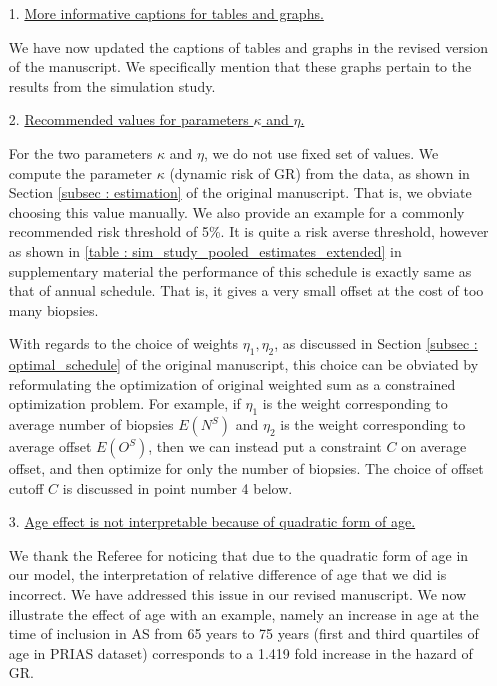 \begin{enumerate}
	\item[1.] \underline{More informative captions for tables and graphs.}

    We have now updated the captions of tables and graphs in the revised version of the manuscript. We specifically mention that these graphs pertain to the results from the simulation study.
	
    \item[2.] \underline{Recommended values for parameters $\kappa$ and $\eta$.}

    For the two parameters $\kappa$ and $\eta$, we do not use fixed set of values. We compute the parameter $\kappa$ (dynamic risk of GR) from the data, as shown in Section \ref{subsec : estimation} of the original manuscript. That is, we obviate choosing this value manually. We also provide an example for a commonly recommended risk threshold of 5\%. It is quite a risk averse threshold, however as shown in \ref{table : sim_study_pooled_estimates_extended} in supplementary material the performance of this schedule is exactly same as that of annual schedule. That is, it gives a very small offset at the cost of too many biopsies.

	With regards to the choice of weights $\eta_1, \eta_2$, as discussed in Section \ref{subsec : optimal_schedule} of the original manuscript, this choice can be obviated by reformulating the optimization of original weighted sum as a constrained optimization problem. For example, if $\eta_1$ is the weight corresponding to average number of biopsies $E(N^S)$ and $\eta_2$ is the weight corresponding to average offset $E(O^S)$, then we can instead put a constraint $C$ on average offset, and then optimize for only the number of biopsies. The choice of offset cutoff $C$ is discussed in point number 4 below.

	\item[3.] \underline{Age effect is not interpretable because of quadratic form of age.}

    We thank the Referee for noticing that due to the quadratic form of age in our model, the interpretation of relative difference of age that we did is incorrect. We have addressed this issue in our revised manuscript. We now illustrate the effect of age with an example, namely an increase in age at the time of inclusion in AS from 65 years to 75 years (first and third quartiles of age in PRIAS dataset) corresponds to a 1.419 fold increase in the hazard of GR.


\end{enumerate}
